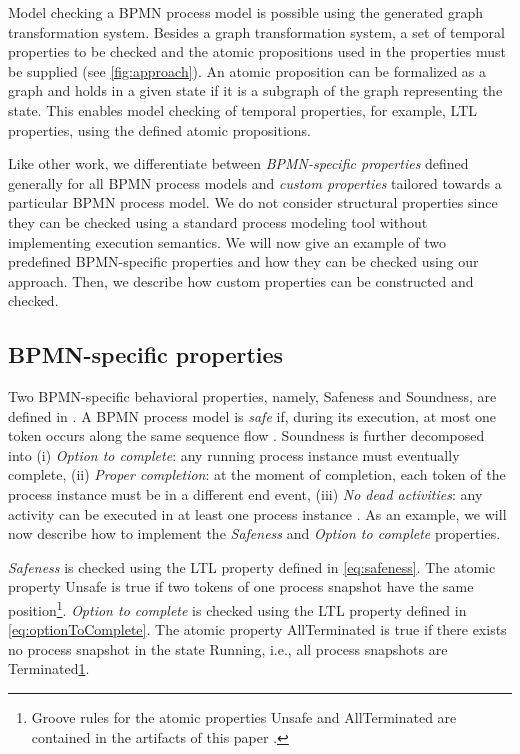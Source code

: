 \documentclass[submission, copyright, creativecommons]{eptcs}
\begin{document}
Model checking a BPMN process model is possible using the generated graph transformation system.
Besides a graph transformation system, a set of temporal properties to be checked and the atomic propositions used in the properties must be supplied (see \cref{fig:approach}).
An atomic proposition can be formalized as a graph and holds in a given state if it is a subgraph of the graph representing the state.
This enables model checking of temporal properties, for example, LTL properties, using the defined atomic propositions.

Like other work, we differentiate between \emph{BPMN-specific properties} defined generally for all BPMN process models and \emph{custom properties} tailored towards a particular BPMN process model.
We do not consider structural properties since they can be checked using a standard process modeling tool without implementing execution semantics.
We will now give an example of two predefined BPMN-specific properties and how they can be checked using our approach.
Then, we describe how custom properties can be constructed and checked.

\subsection{BPMN-specific properties}
Two BPMN-specific behavioral properties, namely, Safeness and Soundness, are defined in \cite{corradiniClassificationBPMNCollaborations2018}.
A BPMN process model is \emph{safe} if, during its execution, at most one token occurs along the same sequence flow \cite{corradiniClassificationBPMNCollaborations2018}.
Soundness is further decomposed into (i) \emph{Option to complete}: any running process instance must eventually complete, (ii) \emph{Proper completion}: at the moment of completion, each token of the process instance must be in a different end event, (iii) \emph{No dead activities}: any activity can be executed in at least one process instance \cite{corradiniClassificationBPMNCollaborations2018}.
As an example, we will now describe how to implement the \emph{Safeness} and \emph{Option to complete} properties.

\emph{Safeness} is checked using the LTL property defined in \eqref{eq:safeness}.
The atomic property \textsf{Unsafe} is true if two tokens of one process snapshot have the same position\footnote{\label{footnote:atomicProps}Groove rules for the atomic properties \textsf{Unsafe} and \textsf{AllTerminated} are contained in the artifacts of this paper \cite{timkrauterArtifactsTERMGRAPH2022}.}.
\emph{Option to complete} is checked using the LTL property defined in \eqref{eq:optionToComplete}.
The atomic property \textsf{AllTerminated} is true if there exists no process snapshot in the state \textsf{Running}, i.e., all process snapshots are \textsf{Terminated}\cref{footnote:atomicProps}.
\end{document}
